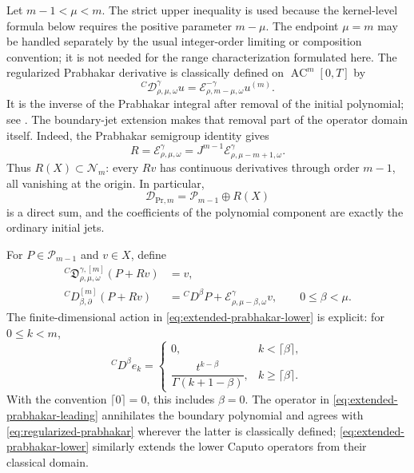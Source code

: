 \documentclass[11pt]{article}
\numberwithin{equation}{section}
\theoremstyle{definition}
\theoremstyle{remark}
\newcommand{\D}{\mathcal D}
\newcommand{\E}{\mathcal E}
\newcommand{\AC}{\operatorname{AC}}
\begin{document}
Let $m-1<\mu<m$. The strict upper inequality is used because the kernel-level formula below requires the positive parameter $m-\mu$. The endpoint $\mu=m$ may be handled separately by the usual integer-order limiting or composition convention; it is not needed for the range characterization formulated here. The regularized Prabhakar derivative is classically defined on $\AC^m[0,T]$ by
\begin{equation}
{}^C\!\D_{\rho,\mu,\omega}^{\gamma}u
=\E_{\rho,m-\mu,\omega}^{-\gamma}u^{(m)}.
\label{eq:regularized-prabhakar}
\end{equation}
It is the inverse of the Prabhakar integral after removal of the initial polynomial; see \cite{Giusti2020}. The boundary-jet extension makes that removal part of the operator domain itself. Indeed, the Prabhakar semigroup identity gives
\begin{equation}
R=\E_{\rho,\mu,\omega}^{\gamma}
=J^{m-1}\E_{\rho,\mu-m+1,\omega}^{\gamma}.
\label{eq:prabhakar-jet-factor}
\end{equation}
Thus $R(X)\subset\mathcal N_m$: every $Rv$ has continuous derivatives through order $m-1$, all vanishing at the origin. In particular,
\begin{equation}
\mathcal D_{\mathrm{Pr},m}
=\mathcal P_{m-1}\oplus R(X)
\label{eq:prabhakar-affine-domain}
\end{equation}
is a direct sum, and the coefficients of the polynomial component are exactly the ordinary initial jets.

For $P\in\mathcal P_{m-1}$ and $v\in X$, define
\begin{align}
{}^C\!\mathfrak D_{\rho,\mu,\omega}^{\gamma,[m]}(P+Rv)
&=v,
\label{eq:extended-prabhakar-leading}\\
{}^C\!D_{\beta,\partial}^{[m]}(P+Rv)
&={}^CD^\beta P+\E_{\rho,\mu-\beta,\omega}^{\gamma}v,
\qquad 0\le\beta<\mu.
\label{eq:extended-prabhakar-lower}
\end{align}
The finite-dimensional action in \eqref{eq:extended-prabhakar-lower} is explicit: for $0\le k<m$,
\begin{equation}
{}^CD^\beta e_k=
\begin{cases}
0,&k<\lceil\beta\rceil,\\[3pt]
\dfrac{t^{k-\beta}}{\Gamma(k+1-\beta)},&k\ge\lceil\beta\rceil.
\end{cases}
\label{eq:caputo-on-jets}
\end{equation}
With the convention $\lceil0\rceil=0$, this includes $\beta=0$. The operator in \eqref{eq:extended-prabhakar-leading} annihilates the boundary polynomial and agrees with \eqref{eq:regularized-prabhakar} wherever the latter is classically defined; \eqref{eq:extended-prabhakar-lower} similarly extends the lower Caputo operators from their classical domain.
\end{document}
